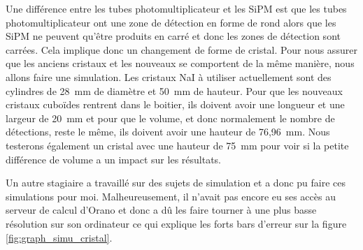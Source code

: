 Une différence entre les tubes photomultiplicateur et les SiPM est que les tubes photomultiplicateur ont une zone de détection en forme de rond alors que les SiPM ne peuvent qu’être produits en carré et donc les zones de détection sont carrées. Cela implique donc un changement de forme de cristal. Pour nous assurer que les anciens cristaux et les nouveaux se comportent de la même manière, nous allons faire une simulation. Les cristaux NaI à utiliser actuellement sont des cylindres de 28~mm de diamètre et 50~mm de hauteur. Pour que les nouveaux cristaux cuboïdes rentrent dans le boitier, ils doivent avoir une longueur et une largeur de 20~mm et pour que le volume, et donc normalement le nombre de détections, reste le même, ils doivent avoir une hauteur de 76,96~mm. Nous testerons également un cristal avec une hauteur de 75~mm pour voir si la petite différence de volume a un impact sur les résultats.

Un autre stagiaire a travaillé sur des sujets de simulation et a donc pu faire ces simulations pour moi. Malheureusement, il n'avait pas encore eu ses accès au serveur de calcul d'Orano et donc a dû les faire tourner à une plus basse résolution sur son ordinateur ce qui explique les forts bars d'erreur sur la figure \ref{fig:graph_simu_cristal}. %
